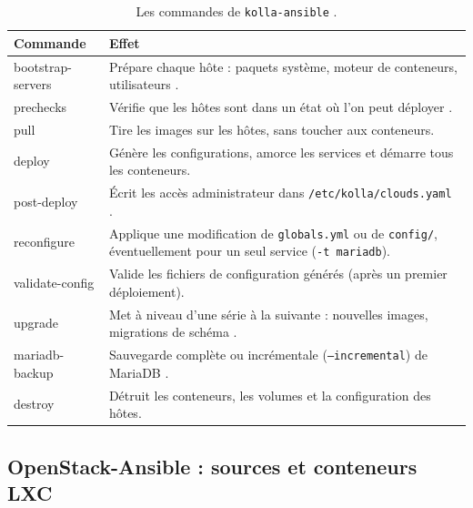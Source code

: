 \begin{table}[!ht]
\centering
\renewcommand{\arraystretch}{1.25}
\begin{tabular}{@{}>{\raggedright\arraybackslash\ttfamily\small}p{3.3cm}>{\raggedright\arraybackslash}p{12.2cm}@{}}
\toprule
\textrm{\textbf{Commande}} & \textbf{Effet} \\
\midrule
bootstrap-servers & Prépare chaque hôte : paquets système, moteur de conteneurs, utilisateurs \parencite{kolla-ansible-quickstart}. \\
prechecks & Vérifie que les hôtes sont dans un état où l'on peut déployer \parencite{kolla-ansible-troubleshooting}. \\
pull & Tire les images sur les hôtes, sans toucher aux conteneurs. \\
deploy & Génère les configurations, amorce les services et démarre tous les conteneurs. \\
post-deploy & Écrit les accès administrateur dans \texttt{/etc/kolla/clouds.yaml} \parencite{kolla-ansible-quickstart}. \\
reconfigure & Applique une modification de \texttt{globals.yml} ou de \texttt{config/}, éventuellement pour un seul service (\texttt{-t mariadb}). \\
validate-config & Valide les fichiers de configuration générés (après un premier déploiement). \\
upgrade & Met à niveau d'une série à la suivante : nouvelles images, migrations de schéma \parencite{kolla-ansible-operating}. \\
mariadb-backup & Sauvegarde complète ou incrémentale (\texttt{--incremental}) de MariaDB \parencite{kolla-ansible-mariadb-backup}. \\
destroy & Détruit les conteneurs, les volumes et la configuration des hôtes. \\
\bottomrule
\end{tabular}
\caption{Les commandes de \texttt{kolla-ansible} \parencite{kolla-ansible-operating,kolla-ansible-source}.}
\label{tab:dep-kolla-cmd}
\end{table}

\subsection{OpenStack-Ansible : sources et conteneurs LXC}\label{sec:dep-osa}

